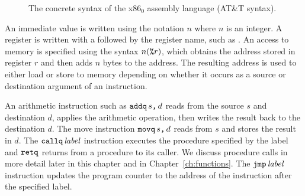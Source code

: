 \documentclass[11pt]{book}
\begin{document}
\begin{figure}[tp]
\caption{The concrete syntax of the x86$_0$ assembly language (AT\&T syntax).}
\label{fig:x86-0-concrete}
\end{figure}

An immediate value is written using the notation \key{\$}$n$ where $n$
is an integer.
%
A register is written with a \key{\%} followed by the register name,
such as .
%
An access to memory is specified using the syntax $n(\texttt{\%}r)$,
which obtains the address stored in register $r$ and then adds $n$
bytes to the address. The resulting address is used to either load or
store to memory depending on whether it occurs as a source or
destination argument of an instruction.

An arithmetic instruction such as $\texttt{addq}\,s\texttt{,}\,d$ reads from the
source $s$ and destination $d$, applies the arithmetic operation, then
writes the result back to the destination $d$.
%
The move instruction $\texttt{movq}\,s\texttt{,}\,d$ reads from $s$ and
stores the result in $d$.
%
The $\texttt{callq}\,\mathit{label}$ instruction executes the procedure
specified by the label and $\texttt{retq}$ returns from a procedure to
its caller. We discuss procedure calls in more detail later in this
chapter and in Chapter~\ref{ch:functions}. The
$\texttt{jmp}\,\mathit{label}$ instruction updates the program counter to
the address of the instruction after the specified label.
\end{document}
